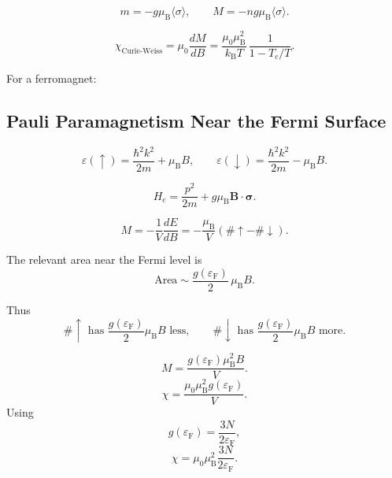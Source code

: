 \documentclass[11pt,a4paper]{article}
\newcommand{\kB}{k_{\mathrm B}}
\newcommand{\muB}{\mu_{\mathrm B}}
\newcommand{\epsF}{\varepsilon_{\mathrm F}}
\newcommand{\vect}[1]{\boldsymbol{#1}}
\begin{document}
\[
  m=-g\muB\langle\sigma\rangle,
  \qquad
  M=-ng\muB\langle\sigma\rangle.
\]

\[
  \chi_{\mathrm{Curie\text{-}Weiss}}
  =
  \mu_0\frac{dM}{dB}
  =
  \frac{\mu_0\muB^2}{\kB T}\,
  \frac{1}{1-T_c/T}.
\]

For a ferromagnet:
\begin{center}
\end{center}

\subsection{Pauli Paramagnetism Near the Fermi Surface}

\[
  \varepsilon(\uparrow)
  =
  \frac{\hbar^2k^2}{2m}+\muB B,
  \qquad
  \varepsilon(\downarrow)
  =
  \frac{\hbar^2k^2}{2m}-\muB B.
\]

\[
  H_e=\frac{p^2}{2m}+g\muB\vect B\cdot\vect\sigma.
\]

\[
  M=-\frac{1}{V}\frac{dE}{dB}
  =
  -\frac{\muB}{V}\left(\#\uparrow-\#\downarrow\right).
\]

The relevant area near the Fermi level is
\[
  \text{Area}\sim \frac{g(\epsF)}{2}\,\muB B.
\]

Thus
\[
  \#\uparrow \text{ has } \frac{g(\epsF)}{2}\muB B \text{ less},
  \qquad
  \#\downarrow \text{ has } \frac{g(\epsF)}{2}\muB B \text{ more}.
\]

\[
  M=\frac{g(\epsF)\muB^2 B}{V}.
\]
\[
  \chi
  =
  \frac{\mu_0\muB^2g(\epsF)}{V}.
\]
Using
\[
  g(\epsF)=\frac{3N}{2\epsF},
\]
\[
  \chi
  =
  \mu_0\muB^2\frac{3N}{2\epsF}.
\]
\end{document}
